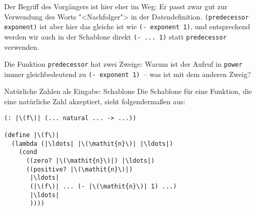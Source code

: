 Der Begriff des Vorgängers ist hier eher im Weg: Er passt zwar gut zur
Verwendung des Worts "<Nachfolger"> in der
Datendefinition. \lstinline{(predecessor exponent)} ist aber hier das
gleiche ist wie \lstinline{(- exponent 1)}, und entsprechend werden
wir auch in der Schablone direkt \lstinline{(- ... 1)} statt
\lstinline{predecessor} verwenden.
\begin{aufgabe}
  Die Funktion \lstinline{predecessor} hat zwei Zweige: Warum ist der
  Aufruf in \lstinline{power} immer gleichbedeutend zu
  \lstinline{(- exponent 1)}~-- was ist mit dem anderen Zweig?
\end{aufgabe}


\begin{konstruktionsanleitung}{Natürliche Zahlen als Eingabe: Schablone}
  \label{ka:nats-eingabe-schablone}
  Die Schablone für eine Funktion, die eine natürliche Zahl akzeptiert, sieht
folgendermaßen aus:
%
\begin{lstlisting}
(: |\(f\)| (... natural ... -> ...))

(define |\(f\)|
  (lambda (|\ldots| |\(\mathit{n}\)| |\ldots|)
    (cond
      ((zero? |\(\mathit{n}\)|) |\ldots|)
      ((positive? |\(\mathit{n}\)|)
       |\ldots|
       (|\(f\)| ... (- |\(\mathit{n}\)| 1) ...)
       |\ldots|
       ))))
\end{lstlisting}
  
\end{konstruktionsanleitung}

